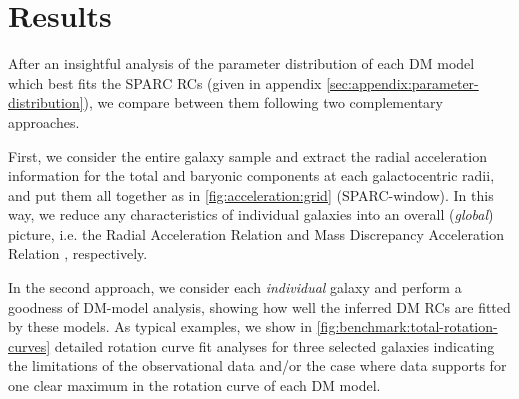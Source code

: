 \section{Results}
\label{sec:results}

After an insightful analysis of the parameter distribution of each DM model which best fits the SPARC RCs (given in appendix \ref{sec:appendix:parameter-distribution}), we compare between them following two complementary approaches.

First, we consider the entire galaxy sample and extract the radial acceleration information for the total and baryonic components at each galactocentric radii, and put them all together as in \cref{fig:acceleration:grid} (SPARC-window). In this way, we reduce any characteristics of individual galaxies into an overall (\textit{global}) picture, i.e. the Radial Acceleration Relation \citep{2016PhRvL.117t1101M} and Mass Discrepancy Acceleration Relation \citep{2004ApJ...609..652M,2014Galax...2..601M}, respectively.

In the second approach, we consider each \textit{individual} galaxy and perform a goodness of DM-model analysis, showing how well the inferred DM RCs are fitted by these models. As typical examples, we show in \cref{fig:benchmark:total-rotation-curves} detailed rotation curve fit analyses for three selected galaxies indicating the limitations of the observational data and/or the case where data supports for one clear maximum in the rotation curve of each DM model.




